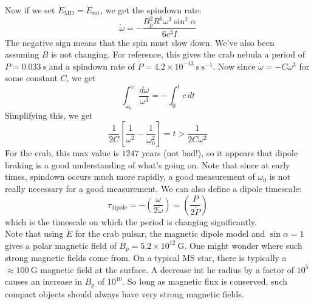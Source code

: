 \documentclass[10pt]{article}
\numberwithin{equation}{section}
\newcommand{\n}{\noindent}
\begin{document}
	Now if we set $\dot{E}_{\mathrm{MD}}=\dot{E}_{\mathrm{rot}}$, we get the spindown rate:
	\begin{equation}
		\label{eq:spindown:7} \dot{\omega} = -\frac{B_p^2R^6\omega^3\sin^2\alpha}{6c^3 I}
	\end{equation}
	The negative sign means that the spin must slow down. We've also been assuming $B$ is not changing. For reference, this gives the crab nebula a period of $P=0.033\ \mathrm{s}$ and a spindown rate of $\dot{P} = 4.2\times 10^{-13}\ \mathrm{s\ s^{-1}}$. Now since $\dot{\omega}=-C\omega^3$ for some constant $C$, we get
	\begin{equation}
		\label{eq:spindown:8} \int_{\omega_0}^\omega \frac{d\omega}{\omega^3} = -\int_0^t c\,dt
	\end{equation}
	Simplifying this, we get
	\begin{equation}
		\label{eq:spindown:9} \frac{1}{2C}\left[\frac{1}{\omega^2}-\frac{1}{\omega_0^2}\right] = t > \frac{1}{2C\omega^2}
	\end{equation}
	For the crab, this max value is $1247$ years (not bad!), so it appears that dipole braking is a good understanding of what's going on. Note that since at early times, spindown occurs much more rapidly, a good measurement of $\omega_0$ is not really necessary for a good measurement. We can also define a dipole timescale:
	\begin{equation}
		\label{eq:spindown:10} \tau_{\mathrm{dipole}} = -\left(\frac{\omega}{2\dot{\omega}}\right) = \left(\frac{P}{2\dot{P}}\right)
	\end{equation}
	which is the timescale on which the period is changing significantly.\\
	
	\n Note that using $\dot{E}$ for the crab pulsar, the magnetic dipole model and $\sin\alpha=1$ gives a polar magnetic field of $B_p = 5.2\times 10^{12}\ \mathrm{G}$. One might wonder where such strong magnetic fields come from. On a typical MS star, there is typically a $\approx 100\ \mathrm{G}$ magnetic field at the surface. A decrease int he radius by a factor of $10^5$ causes an increase in $B_p$ of $10^{10}$. So long as magnetic flux is conserved, such compact objects should always have very strong magnetic fields.	
\end{document}

